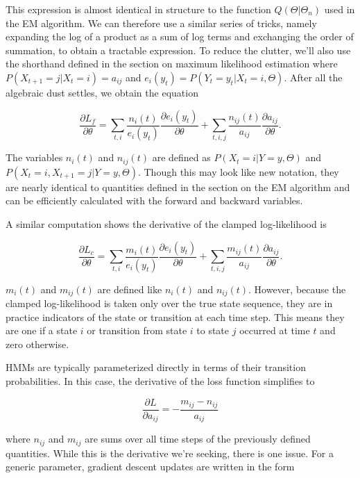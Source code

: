 This expression is almost identical in structure to the function $Q(\Theta|\Theta_n)$ used in the EM algorithm. We can therefore use a similar series of tricks, namely expanding the log of a product as a sum of log terms and exchanging the order of summation, to obtain a tractable expression. To reduce the clutter, we'll also use the shorthand defined in the section on maximum likelihood estimation where $P(X_{t+1}=j|X_t=i) = a_{ij}$ and $e_i(y_t) = P(Y_t=y_t|X_t=i, \Theta)$. After all the algebraic dust settles, we obtain the equation

\begin{equation*}
\frac{\partial L_f}{\partial \theta} = \sum_{t,i} \frac{n_i(t)}{e_i(y_t)} \frac{\partial e_i(y_t)}{\partial \theta} + \sum_{t,i,j} \frac{n_{ij}(t)}{a_{ij}} \frac{\partial a_{ij}}{\partial \theta}.
\end{equation*}

The variables $n_i(t)$ and $n_{ij}(t)$ are defined as $P(X_t=i|Y=y, \Theta)$ and $P(X_t=i, X_{t+1}=j|Y=y, \Theta)$. Though this may look like new notation, they are nearly identical to quantities defined in the section on the EM algorithm and can be efficiently calculated with the forward and backward variables.

A similar computation shows the derivative of the clamped log-likelihood is

\begin{equation*}
\frac{\partial L_c}{\partial \theta} = \sum_{t,i} \frac{m_i(t)}{e_i(y_t)} \frac{\partial e_i(y_t)}{\partial \theta} + \sum_{t,i,j} \frac{m_{ij}(t)}{a_{ij}} \frac{\partial a_{ij}}{\partial \theta}.
\end{equation*}

$m_i(t)$ and $m_{ij}(t)$ are defined like $n_i(t)$ and $n_{ij}(t)$. However, because the clamped log-likelihood is taken only over the true state sequence, they are in practice indicators of the state or transition at each time step. This means they are one if a state $i$ or transition from state $i$ to state $j$ occurred at time $t$ and zero otherwise.

HMMs are typically parameterized directly in terms of their transition probabilities. In this case, the derivative of the loss function simplifies to

\begin{equation*}
\frac{\partial L}{\partial a_{ij}} = -\frac{m_{ij} - n_{ij}}{a_{ij}}
\end{equation*}

where $n_{ij}$ and $m_{ij}$ are sums over all time steps of the previously defined quantities. While this is the derivative we're seeking, there is one issue. For a generic parameter, gradient descent updates are written in the form

